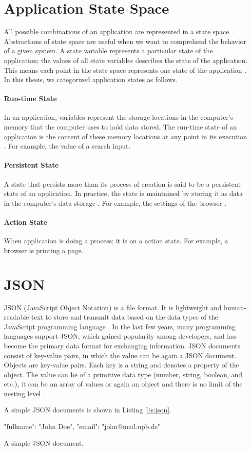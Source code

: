\section{Application State Space}
All possible combinations of an application are represented in a state space. Abstractions of state space are useful when we want to comprehend the behavior of a given system. A state variable represents a particular state of the application; the values of all state variables describes the state of the application. This means each point in the state space represents one state of the application \cite{state-space}. In this thesis, we categorized application states as follows.

\paragraph{Run-time State}
In an application, variables represent the storage locations in the computer's memory that the computer uses to hold data stored. The run-time state of an application is the content of these memory locations at any point in its execution \cite{Laplante2000-ui}. For example, the value of a search input.

\paragraph{Persistent State}
A state that persists more than its process of creation is said to be a persistent state of an application. In practice, the state is maintained by storing it as data in the computer's data storage \cite{pstate}. For example, the settings of the browser .


\paragraph{Action State}
When application is doing a process; it is on a action state. For example, a browser is printing a page.

\section{JSON}
JSON (JavaScript Object Notation) is a file format. It is lightweight and human-readable text to store and transmit data based on the data types of the JavaScript programming language \cite{json}. In the last few years, many programming languages support JSON, which gained popularity among developers, and has become the primary data format for exchanging information. JSON documents consist of key-value pairs, in which the value can be again a JSON document. Objects are key-value pairs. Each key is a string and denotes a property of the object. The value can be of a primitive data type (number, string, boolean, and etc.), it can be an array of values or again an object and there is no limit of the nesting level \cite{json-schema}. 

A simple JSON documents is shown in Listing \ref{lis:json}.

\FloatBarrier
\begin{code}
\begin{json}
{
    "fullname": "John Doe",
    "email": "john@mail.upb.de"
}
\end{json}
\caption{A simple JSON document.}
\label{lis:json}
\end{code}
\FloatBarrier
